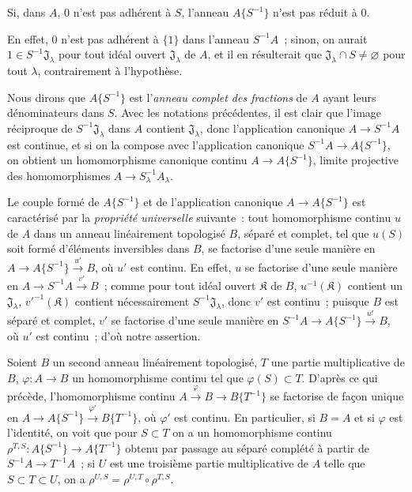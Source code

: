 
\begin{corollary}[7.6.4]
\label{0.7.6.4-fr}
Si, dans $A$, $0$ n'est pas adhérent à $S$, l'anneau $A\{S^{-1}\}$ n'est pas
réduit à $0$.
\end{corollary}

En effet, $0$ n'est pas adhérent à $\{1\}$ dans l'anneau $S^{-1}A$~; sinon,
on aurait $1\in S^{-1}\mathfrak J_\lambda$ pour tout idéal ouvert
$\mathfrak J_\lambda$ de $A$, et il en résulterait que
$\mathfrak J_\lambda\cap S\neq\varnothing$ pour tout $\lambda$, contrairement
à l'hypothèse.

\begin{env}[7.6.5]
\label{0.7.6.5-fr}
Nous dirons que $A\{S^{-1}\}$ est l'\emph{anneau complet des fractions} de $A$
ayant leurs dénominateurs dans $S$. Avec les notations précédentes, il est clair
que l'image réciproque de $S^{-1}\mathfrak J_\lambda$ dans $A$ contient
$\mathfrak J_\lambda$, donc l'application canonique $A\to S^{-1}A$ est
continue, et si on la compose avec l'application canonique
$S^{-1}A\to A\{S^{-1}\}$, on obtient un homomorphisme canonique continu
$A\to A\{S^{-1}\}$, limite projective des homomorphismes
$A\to S_\lambda^{-1}A_\lambda$.
\end{env}

\begin{env}[7.6.6]
\label{0.7.6.6-fr}
Le couple formé de $A\{S^{-1}\}$ et de l'application canonique
$A\to A\{S^{-1}\}$ est caractérisé par la \emph{propriété universelle}
suivante~: tout homomorphisme continu $u$ de $A$ dans un anneau linéairement
topologisé $B$, séparé et complet, tel que $u(S)$ soit formé d'éléments
inversibles dans $B$, se factorise d'une seule manière en
$A\to A\{S^{-1}\}\xrightarrow{u'}B$, où $u'$ est continu. En effet, $u$ se
factorise d'une seule manière en $A\to S^{-1}A\xrightarrow{v'}B$~; comme pour
tout idéal ouvert $\mathfrak K$ de $B$, $u^{-1}(\mathfrak K)$ contient un
$\mathfrak J_\lambda$, ${v'}^{-1}(\mathfrak K)$ contient nécessairement
$S^{-1}\mathfrak J_\lambda$, donc $v'$ est continu~; puisque $B$ est séparé et
complet, $v'$ se factorise d'une seule manière en
$S^{-1}A\to A\{S^{-1}\}\xrightarrow{u'}B$, où $u'$ est continu~; d'où notre
assertion.
\end{env}

\begin{env}[7.6.7]
\label{0.7.6.7-fr}
Soient $B$ un second anneau linéairement topologisé, $T$ une partie
multiplicative de $B$, $\varphi:A\to B$ un homomorphisme continu tel que
$\varphi(S)\subset T$. D'après ce qui précède, l'homomorphisme continu
$A\xrightarrow{\varphi}B\to B\{T^{-1}\}$ se factorise de façon unique en
$A\to A\{S^{-1}\}\xrightarrow{\varphi'}B\{T^{-1}\}$, où $\varphi'$ est
continu. En particulier, si $B=A$ et si $\varphi$ est l'identité, on voit que
pour $S\subset T$ on a un homomorphisme continu
$\rho^{T,S}:A\{S^{-1}\}\to A\{T^{-1}\}$ obtenu par passage au séparé complété
à partir de $S^{-1}A\to T^{-1}A$~; si $U$ est une troisième partie
multiplicative de $A$ telle que $S\subset T\subset U$, on a
$\rho^{U,S}=\rho^{U,T}\circ\rho^{T,S}$.
\end{env}


